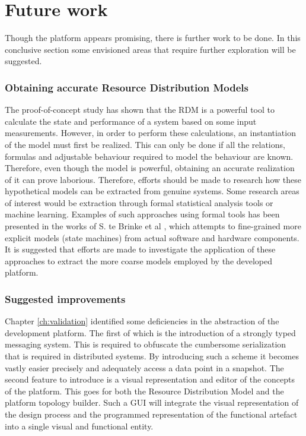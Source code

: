 \section{Future work}
Though the platform appears promising, there is further work to be done. In this conclusive section some envisioned areas that require further exploration will be suggested.

\subsubsection{Obtaining accurate Resource Distribution Models}
The proof-of-concept study has shown that the RDM is a powerful tool to calculate the state and performance of a system based on some input measurements. However, in order to perform these calculations, an instantiation of the model must first be realized. This can only be done if all the relations, formulas and adjustable behaviour required to model the behaviour are known. Therefore, even though the model is powerful, obtaining an accurate realization of it can prove laborious. Therefore, efforts should be made to research how these hypothetical models can be extracted from genuine systems. Some research areas of interest would be extraction through formal statistical analysis tools or machine learning. Examples of such approaches using formal tools has been presented in the works of S. te Brinke et al \cite{deriving_rum_1, deriving_rum_2}, which attempts to fine-grained more explicit models (state machines) from actual software and hardware components. It is suggested that efforts are made to investigate the application of these approaches to extract the more coarse models employed by the developed platform.

\subsubsection{Suggested improvements}
Chapter \ref{ch:validation} identified some deficiencies in the abstraction of the development platform. The first of which is the introduction of a strongly typed messaging system. This is required to obfuscate the cumbersome serialization that is required in distributed systems. By introducing such a scheme it becomes vastly easier precisely and adequately access a data point in a snapshot.
The second feature to introduce is a visual representation and editor of the concepts of the platform. This goes for both the Resource Distribution Model and the platform topology builder. Such a GUI will integrate the visual representation of the design process and the programmed representation of the functional artefact into a single visual and functional entity.

